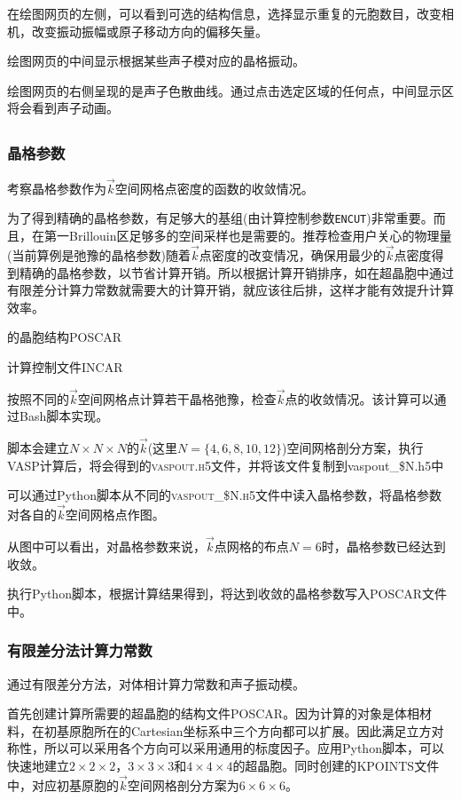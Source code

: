 在绘图网页的左侧，可以看到可选的结构信息，选择显示重复的元胞数目，改变相机，改变振动振幅或原子移动方向的偏移矢量。

绘图网页的中间显示根据某些声子模对应的晶格振动。%

绘图网页的右侧呈现的是声子色散曲线。通过点击选定区域的任何点，中间显示区将会看到声子动画。

\subsection{}
\subsubsection{晶格参数}
考察晶格参数作为$\vec k$空间网格点密度的函数的收敛情况。

为了得到精确的晶格参数，有足够大的基组(由计算控制参数\texttt{ENCUT})非常重要。而且，在第一\textrm{Brillouin}区足够多的空间采样也是需要的。推荐检查用户关心的物理量(当前算例是弛豫的晶格参数)随着$\vec k$点密度的改变情况，确保用最少的$\vec k$点密度得到精确的晶格参数，以节省计算开销。所以根据计算开销排序，如在超晶胞中通过有限差分计算力常数就需要大的计算开销，就应该往后排，这样才能有效提升计算效率。

的晶胞结构\textrm{POSCAR}

计算控制文件\textrm{INCAR}

按照不同的$\vec k$空间网格点计算若干晶格弛豫，检查$\vec k$点的收敛情况。该计算可以通过\textrm{Bash}脚本实现。

脚本会建立$N\times N\times N$的$\vec k$(这里$N=\{4,6,8,10,12\}$)空间网格剖分方案，执行\textrm{VASP}计算后，将会得到的\textsc{vaspout.h5}文件，并将该文件复制到\textrm{vaspout\_\$N.h5}中

可以通过\textrm{Python}脚本从不同的\textsc{vaspout\_\$N.h5}文件中读入晶格参数，将晶格参数对各自的$\vec k$空间网格点作图。

从图中可以看出，对晶格参数来说，$\vec k$点网格的布点$N=6$时，晶格参数已经达到收敛。

执行\textrm{Python}脚本，根据计算结果得到，将达到收敛的晶格参数写入\textrm{POSCAR}文件中。

\subsubsection{有限差分法计算力常数}
通过有限差分方法，对体相计算力常数和声子振动模。

首先创建计算所需要的超晶胞的结构文件\textrm{POSCAR}。因为计算的对象是体相材料，在初基原胞所在的\textrm{Cartesian}坐标系中三个方向都可以扩展。因此满足立方对称性，所以可以采用各个方向可以采用通用的标度因子。应用\textrm{Python}脚本，可以快速地建立$2\times2\times2$，$3\times3\times3$和$4\times4\times4$的超晶胞。同时创建的\textrm{KPOINTS}文件中，对应初基原胞的$\vec k$空间网格剖分方案为$6\times6\times6$。%

